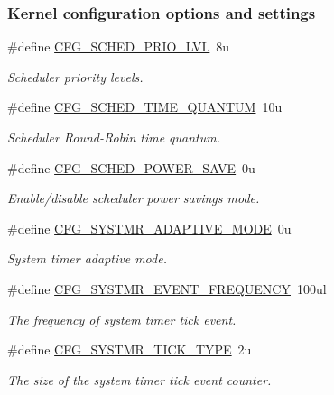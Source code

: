\subsubsection*{Kernel configuration options and settings}
\begin{DoxyCompactItemize}
\item 
\#define \hyperlink{group__kern__cfg_ga56bd89fe76f7fe22f3d8805bc3c68892}{C\-F\-G\-\_\-\-S\-C\-H\-E\-D\-\_\-\-P\-R\-I\-O\-\_\-\-L\-V\-L}~8u
\begin{DoxyCompactList}\small\item\em Scheduler priority levels. \end{DoxyCompactList}\item 
\#define \hyperlink{group__kern__cfg_ga0bd286f16bb67585f14c4d1e45be8ad1}{C\-F\-G\-\_\-\-S\-C\-H\-E\-D\-\_\-\-T\-I\-M\-E\-\_\-\-Q\-U\-A\-N\-T\-U\-M}~10u
\begin{DoxyCompactList}\small\item\em Scheduler Round-\/\-Robin time quantum. \end{DoxyCompactList}\item 
\#define \hyperlink{group__kern__cfg_ga4e6ab4994b34501bb71e75717b093376}{C\-F\-G\-\_\-\-S\-C\-H\-E\-D\-\_\-\-P\-O\-W\-E\-R\-\_\-\-S\-A\-V\-E}~0u
\begin{DoxyCompactList}\small\item\em Enable/disable scheduler power savings mode. \end{DoxyCompactList}\item 
\#define \hyperlink{group__kern__cfg_ga5f07eea2a4be92cf0358f52eba6800c9}{C\-F\-G\-\_\-\-S\-Y\-S\-T\-M\-R\-\_\-\-A\-D\-A\-P\-T\-I\-V\-E\-\_\-\-M\-O\-D\-E}~0u
\begin{DoxyCompactList}\small\item\em System timer adaptive mode. \end{DoxyCompactList}\item 
\#define \hyperlink{group__kern__cfg_ga4e46164ae5a37bfc54c67b6f01d93eb1}{C\-F\-G\-\_\-\-S\-Y\-S\-T\-M\-R\-\_\-\-E\-V\-E\-N\-T\-\_\-\-F\-R\-E\-Q\-U\-E\-N\-C\-Y}~100ul
\begin{DoxyCompactList}\small\item\em The frequency of system timer tick event. \end{DoxyCompactList}\item 
\#define \hyperlink{group__kern__cfg_gad69eef523459c5ab485ce2f62bddceca}{C\-F\-G\-\_\-\-S\-Y\-S\-T\-M\-R\-\_\-\-T\-I\-C\-K\-\_\-\-T\-Y\-P\-E}~2u
\begin{DoxyCompactList}\small\item\em The size of the system timer tick event counter. \end{DoxyCompactList}\end{DoxyCompactItemize}
